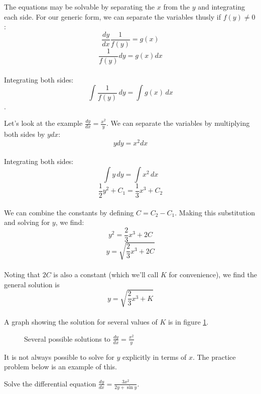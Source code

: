 The equations may be solvable by separating the $x$ from the $y$ and 
integrating each side. For our generic form, we can separate the 
variables thusly if $f(y) \neq 0$: 
$$\frac{dy}{dx}\frac{1}{f(y)} = g(x)$$ 
$$\frac{1}{f(y)}dy = g(x) dx$$ \\
Integrating both sides: $$\int \frac{1}{f(y)}\,dy = \int g(x)\,dx$$.

Let's look at the example $\frac{dy}{dx} = \frac{x^2}{y}$. We can 
separate the variables by multiplying both sides by $y dx$: 
$$y dy = x^2 dx$$\\
Integrating both sides: 
$$\int y\,dy = \int x^2\,dx$$
$$\frac{1}{2}y^2 + C_1 = \frac{1}{3}x^3 + C_2$$ \\
We can combine the constants by defining $C = C_2 - C_1$. Making this 
substitution and solving for $y$, we find: 
$$y^2 = \frac{2}{3} x^3 + 2C$$ 
$$y = \sqrt{\frac{2}{3} x^3 + 2C}$$\\
Noting that $2C$ is also a constant (which we'll call $K$ for 
convenience), we find the general solution is 
$$y = \sqrt{\frac{2}{3} x^3 + K}$$ \\
A graph showing the solution for several values of $K$ is in figure 
\ref{fig:solutions}.

\begin{figure}[htbp]
\centering
    \caption{Several possible solutions to $\frac{dy}{dx} = 
    \frac{x^2}{y}$}
    \label{fig:solutions}
\end{figure}

It is not always possible to solve for $y$ explicitly in terms of 
$x$. The practice problem below is an example of this. 

\begin{Exercise}[label = diffeq1]
	Solve the differential equation $\frac{dy}{dx} = \frac{3x^2}{2y + \sin{y}}$. 
	\vspace{50mm}
\end{Exercise}


